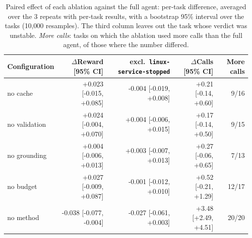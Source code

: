\begin{table}[t]\centering\footnotesize
\caption{Paired effect of each ablation against the full agent: per-task difference, averaged over the 3 repeats with per-task results, with a bootstrap 95\% interval over the tasks (10{,}000 resamples). The third column leaves out the task whose verdict was unstable. \emph{More calls}: tasks on which the ablation used more calls than the full agent, of those where the number differed.}
\label{tab:effects}
\begin{tabular}{@{}lrrrr@{}}\toprule
Configuration & $\Delta$Reward [95\% CI] & excl.\ \texttt{linux-service-stopped} & $\Delta$Calls [95\% CI] & More calls\\\midrule
no cache & +0.023 [-0.015, +0.085] & -0.004 [-0.019, +0.008] & +0.21 [-0.14, +0.60] & 9/16\\
no validation & +0.024 [-0.004, +0.070] & +0.004 [-0.006, +0.015] & +0.17 [-0.14, +0.50] & 9/15\\
no grounding & +0.004 [-0.006, +0.013] & +0.003 [-0.007, +0.013] & +0.27 [-0.06, +0.65] & 7/13\\
no budget & +0.027 [-0.009, +0.087] & -0.001 [-0.012, +0.010] & +0.52 [-0.21, +1.29] & 12/17\\
no method & -0.038 [-0.077, -0.004] & -0.027 [-0.061, +0.003] & +3.48 [+2.49, +4.51] & 20/20\\
\bottomrule\end{tabular}\end{table}
